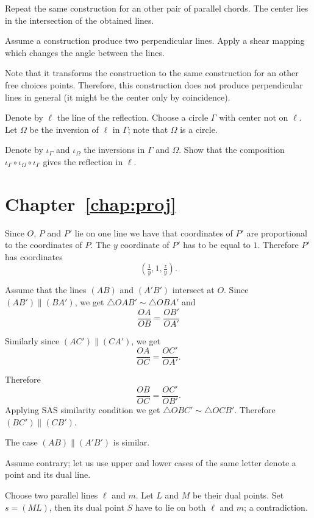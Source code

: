 Repeat the same construction for an other pair of parallel chords.
The center lies in the intersection of the obtained lines.

Assume a construction produce  two perpendicular lines.
Apply a shear mapping which changes the angle between the lines.

Note that it transforms the construction to the same construction for an other free choices points.
Therefore, this construction does not produce perpendicular lines in general
 (it might be the center only by coincidence).
 
Denote by $\ell$ the line of the reflection.
Choose a circle $\Gamma$ with center not on $\ell$.
Let $\Omega$ be the inversion of $\ell$ in $\Gamma$;
note that $\Omega$ is a circle.

Denote by $\iota_\Gamma$ and $\iota_\Omega$ 
the inversions in $\Gamma$ and $\Omega$.
Show that the composition 
$\iota_\Gamma\circ\iota_\Omega\circ\iota_\Gamma$
gives the reflection in $\ell$.


\section*{Chapter~\ref{chap:proj}}
\setcounter{eqtn}{0}

Since $O$, $P$ and $P'$ lie on one line we have
that coordinates of $P'$ are proportional to the coordinates of $P$.
The $y$ coordinate of $P'$ has to be equal to $1$.
Therefore $P'$ has coordinates 
\[(\tfrac1y,1,\tfrac zy).\]


Assume that the lines $(AB)$ and $(A'B')$ intersect at $O$.
Since $(AB')\parallel (BA')$, we get $\triangle OAB'\sim\triangle OBA'$
and
\[\frac{OA}{OB}=\frac{OB'}{OA'}\]

Similarly since $(AC')\parallel (CA')$, 
we get 
\[\frac{OA}{OC}=\frac{OC'}{OA'}.\]

Therefore
\[\frac{OB}{OC}=\frac{OC'}{OB'}.\]
Applying SAS similarity condition we get
$\triangle OBC'\sim\triangle OCB'$.
Therefore $(BC')\parallel (CB')$.

The case $(AB)\parallel(A'B')$ is similar.

Assume contrary; let us use upper and lower cases of the same letter denote a point and its dual line.

Choose two parallel lines $\ell$ and $m$.
Let $L$ and $M$ be their dual points.
Set $s=(ML)$, then its dual point $S$ have to lie on both $\ell$ and $m$;
a contradiction.

